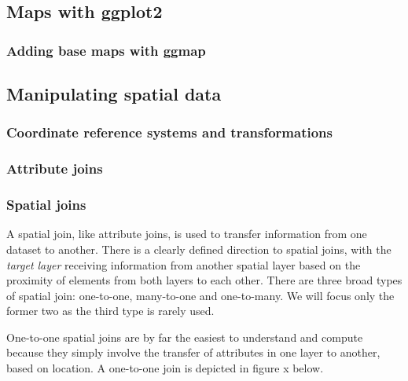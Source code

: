 \documentclass[]{article}
\begin{document}
\subsection{Maps with ggplot2}

\subsubsection{Adding base maps with ggmap}

\subsection{Manipulating spatial data}

\subsubsection{Coordinate reference systems and transformations}

\subsubsection{Attribute joins}

\subsubsection{Spatial joins}

A spatial join, like attribute joins, is used to transfer information
from one dataset to another. There is a clearly defined direction to
spatial joins, with the \emph{target layer} receiving information from
another spatial layer based on the proximity of elements from both
layers to each other. There are three broad types of spatial join:
one-to-one, many-to-one and one-to-many. We will focus only the former
two as the third type is rarely used.

One-to-one spatial joins are by far the easiest to understand and
compute because they simply involve the transfer of attributes in one
layer to another, based on location. A one-to-one join is depicted in
figure x below.
\end{document}
